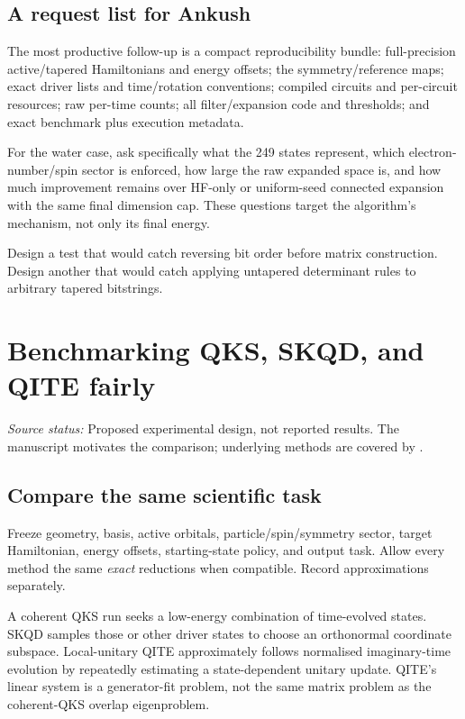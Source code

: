 \documentclass[11pt,a4paper,oneside]{report}
\newcommand{\src}[1]{\par{\small\color{grey}\textit{Source status:} #1}\par}
\newcommand{\checkpoint}[1]{\begin{idea}[Check your understanding]#1\end{idea}}
\begin{document}
\section{A request list for Ankush}
The most productive follow-up is a compact reproducibility bundle: full-precision active/tapered Hamiltonians and energy offsets; the symmetry/reference maps; exact driver lists and time/rotation conventions; compiled circuits and per-circuit resources; raw per-time counts; all filter/expansion code and thresholds; and exact benchmark plus execution metadata.

For the water case, ask specifically what the 249 states represent, which electron-number/spin sector is enforced, how large the raw expanded space is, and how much improvement remains over HF-only or uniform-seed connected expansion with the same final dimension cap. These questions target the algorithm's mechanism, not only its final energy.

\checkpoint{Design a test that would catch reversing bit order before matrix construction. Design another that would catch applying untapered determinant rules to arbitrary tapered bitstrings.}

\chapter{Benchmarking QKS, SKQD, and QITE fairly}\label{ch:benchmark}
\src{Proposed experimental design, not reported results. The manuscript motivates the comparison; underlying methods are covered by \cite{stair,yu,motta}.}

\section{Compare the same scientific task}
Freeze geometry, basis, active orbitals, particle/spin/symmetry sector, target Hamiltonian, energy offsets, starting-state policy, and output task. Allow every method the same \emph{exact} reductions when compatible. Record approximations separately.

A coherent QKS run seeks a low-energy combination of time-evolved states. SKQD samples those or other driver states to choose an orthonormal coordinate subspace. Local-unitary QITE approximately follows normalised imaginary-time evolution by repeatedly estimating a state-dependent unitary update. QITE's linear system is a generator-fit problem, not the same matrix problem as the coherent-QKS overlap eigenproblem.
\end{document}

